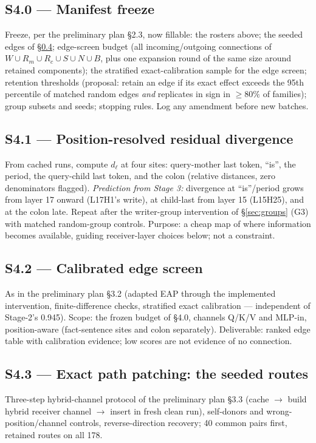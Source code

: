 \subsection{S4.0 --- Manifest freeze}
Freeze, per the preliminary plan \S2.3, now fillable: the rosters above; the seeded
edges of \S\ref{sec:paths}; edge-screen budget (all incoming/outgoing connections of
$W \cup R_m \cup R_c \cup S \cup N \cup B$, plus one expansion round of the same size
around retained components); the stratified exact-calibration sample for the edge
screen; retention thresholds (proposal: retain an edge if its exact effect exceeds the
95th percentile of matched random edges \emph{and} replicates in sign in $\ge 80\%$ of
families); group subsets and seeds; stopping rules. Log any amendment before new
batches.

\subsection{S4.1 --- Position-resolved residual divergence}
\label{sec:div}
From cached runs, compute $d_\ell$ at four sites: query-mother last token, ``is'',
the period, the query-child last token, and the colon (relative distances, zero
denominators flagged). \emph{Prediction from Stage 3:} divergence at ``is''/period
grows from layer 17 onward (L17H1's write), at child-last from layer 15 (L15H25), and
at the colon late. Repeat after the writer-group intervention of \S\ref{sec:groups}
(G3) with matched random-group controls. Purpose: a cheap map of where information
becomes available, guiding receiver-layer choices below; not a constraint.

\subsection{S4.2 --- Calibrated edge screen}
As in the preliminary plan \S3.2 (adapted EAP through the implemented intervention,
finite-difference checks, stratified exact calibration --- independent of Stage-2's
0.945). Scope: the frozen budget of \S4.0, channels Q/K/V and MLP-in, position-aware
(fact-sentence sites and colon separately). Deliverable: ranked edge table with
calibration evidence; low scores are not evidence of no connection.

\subsection{S4.3 --- Exact path patching: the seeded routes}
\label{sec:paths}
Three-step hybrid-channel protocol of the preliminary plan \S3.3 (cache $\to$ build
hybrid receiver channel $\to$ insert in fresh clean run), self-donors and
wrong-position/channel controls, reverse-direction recovery; 40 common pairs first,
retained routes on all 178.

